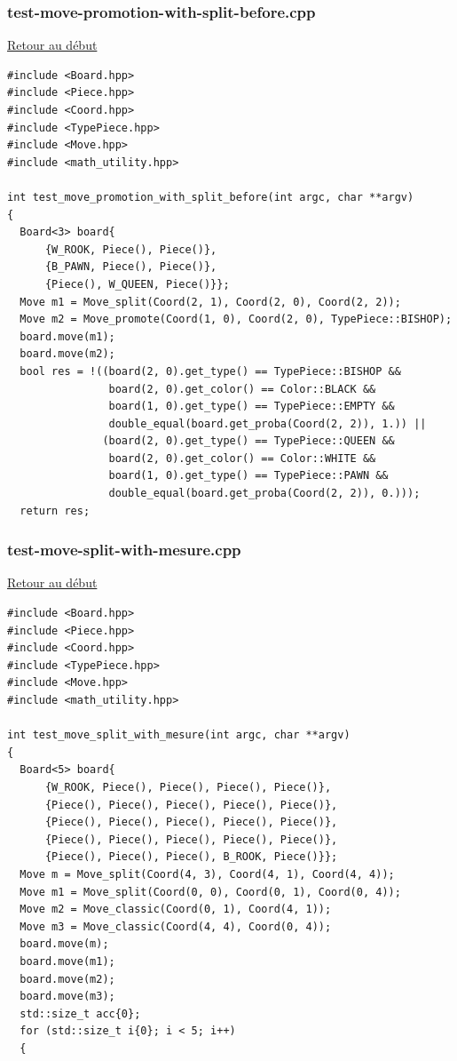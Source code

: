 {\begin{frame}[fragile]
\label{testmovepromotionwithsplitbefore.cpp}
\frametitle{test-move-promotion-with-split-before.cpp}
\hyperlink{conclusion}{Retour au début}\newline
\begin{verbatim}
#include <Board.hpp>
#include <Piece.hpp>
#include <Coord.hpp>
#include <TypePiece.hpp>
#include <Move.hpp>
#include <math_utility.hpp>

int test_move_promotion_with_split_before(int argc, char **argv)
{
  Board<3> board{
      {W_ROOK, Piece(), Piece()},
      {B_PAWN, Piece(), Piece()},
      {Piece(), W_QUEEN, Piece()}};
  Move m1 = Move_split(Coord(2, 1), Coord(2, 0), Coord(2, 2));
  Move m2 = Move_promote(Coord(1, 0), Coord(2, 0), TypePiece::BISHOP);
  board.move(m1);
  board.move(m2);
  bool res = !((board(2, 0).get_type() == TypePiece::BISHOP &&
                board(2, 0).get_color() == Color::BLACK &&
                board(1, 0).get_type() == TypePiece::EMPTY &&
                double_equal(board.get_proba(Coord(2, 2)), 1.)) ||
               (board(2, 0).get_type() == TypePiece::QUEEN &&
                board(2, 0).get_color() == Color::WHITE &&
                board(1, 0).get_type() == TypePiece::PAWN &&
                double_equal(board.get_proba(Coord(2, 2)), 0.)));
  return res;

\end{verbatim}
\end{frame}

\begin{frame}[fragile]
\label{testmovesplitwithmesure.cpp}
\frametitle{test-move-split-with-mesure.cpp}
\hyperlink{conclusion}{Retour au début}\newline
\begin{verbatim}
#include <Board.hpp>
#include <Piece.hpp>
#include <Coord.hpp>
#include <TypePiece.hpp>
#include <Move.hpp>
#include <math_utility.hpp>

int test_move_split_with_mesure(int argc, char **argv)
{
  Board<5> board{
      {W_ROOK, Piece(), Piece(), Piece(), Piece()},
      {Piece(), Piece(), Piece(), Piece(), Piece()},
      {Piece(), Piece(), Piece(), Piece(), Piece()},
      {Piece(), Piece(), Piece(), Piece(), Piece()},
      {Piece(), Piece(), Piece(), B_ROOK, Piece()}};
  Move m = Move_split(Coord(4, 3), Coord(4, 1), Coord(4, 4));
  Move m1 = Move_split(Coord(0, 0), Coord(0, 1), Coord(0, 4));
  Move m2 = Move_classic(Coord(0, 1), Coord(4, 1));
  Move m3 = Move_classic(Coord(4, 4), Coord(0, 4));
  board.move(m);
  board.move(m1);
  board.move(m2);
  board.move(m3);
  std::size_t acc{0};
  for (std::size_t i{0}; i < 5; i++)
  {
\end{verbatim}
\end{frame}

}
